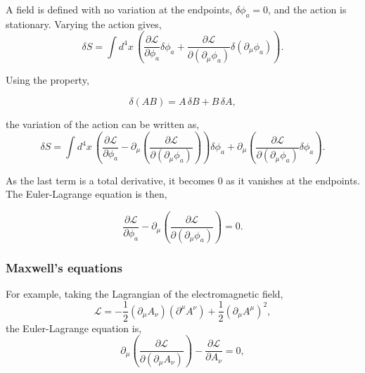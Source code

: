 A field is defined with no variation at the endpoints, $\delta \phi_a = 0$, and the action is stationary. Varying the action gives, 
\begin{equation}
  \delta S = \int d^4x\, \left(\frac{\partial \mathcal{L}}{\partial \phi_a}\delta \phi_a + \frac{\partial \mathcal{L}}{\partial (\partial_\mu \phi_a)}\delta (\partial_\mu \phi_a)\right).
\end{equation}

Using the property, 
\begin{lemma}
  \begin{equation}
    \delta (AB) = A\,\delta B + B\,\delta A,
  \end{equation}
  \vspace{-0.5cm}
\end{lemma}
the variation of the action can be written as,
\begin{equation}
  \delta S = \int d^4x\, \left(\frac{\partial \mathcal{L}}{\partial \phi_a} - \partial_\mu \left(\frac{\partial \mathcal{L}}{\partial (\partial_\mu \phi_a)}\right)\right)\delta \phi_a + \partial_\mu \left(\frac{\partial \mathcal{L}}{\partial (\partial_\mu \phi_a)}\delta \phi_a\right).
\end{equation}

As the last term is a total derivative, it becomes 0 as it vanishes at the endpoints. The Euler-Lagrange equation is then,
\newpage
\begin{definition}
  \begin{equation}
    \frac{\partial \mathcal{L}}{\partial \phi_a} - \partial_\mu \left(\frac{\partial \mathcal{L}}{\partial (\partial_\mu \phi_a)}\right) = 0.
  \end{equation}
  \vspace{-0.5cm}
\end{definition}
\subsubsection{Maxwell's equations}
For example, taking the Lagrangian of the electromagnetic field, 
\begin{equation}
  \mathcal{L} = -\frac{1}{2}(\partial_\mu A_\nu)(\partial^\mu A^\nu) + \frac{1}{2}(\partial_\mu A^\mu)^2,
\end{equation}
the Euler-Lagrange equation is, 
\begin{equation}
  \partial_\mu \left(\frac{\partial \mathcal{L}}{\partial (\partial_\mu A_\nu)}\right) - \frac{\partial \mathcal{L}}{\partial A_\nu} = 0,
\end{equation}

